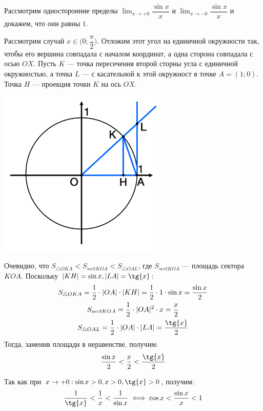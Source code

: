 \documentclass[a4paper,12pt,oneside]{extbook}
\theoremstyle{numbered}
\theoremstyle{unnumbered}
\theoremstyle{named}
\theoremstyle{unnumbered}
\theoremstyle{named}
\theoremstyle{named}
\theoremstyle{named}
\begin{document}
Рассмотрим односторонние пределы \(\displaystyle{\lim_{x \to +0}{\dfrac{\sin{x}}{x}}}\) и \(\displaystyle{\lim_{x \to -0}{\dfrac{\sin{x}}{x}}}\) и докажем, что они равны \(1\).

Рассмотрим случай \(x \in \Big(0; \dfrac{\pi}{2}\Big)\).
Отложим этот угол на единичной окружности так, чтобы его вершина совпадала с началом координат, а одна сторона совпадала с осью \(OX\).
Пусть \(K\) — точка пересечения второй сторны угла с единичной окружностью, а точка \(L\) — с касательной к этой окружност в точке \(A = (1; 0)\). Точка \(H\) — проекция точки \(K\) на ось \(OX\).

\begin{center}
    \includegraphics[width=0.6\textwidth]{limit_1.png}
\end{center}

Очевидно, что \(S_{\triangle OKA} < S_{sect KOA} < S_{\triangle OAL}\), где \(S_{sect KOA}\) — площадь сектора  \(KOA\). Поскольку \(|KH| = \sin{x}, |LA| = \tg{x}\):
\begin{gather*}
    S_{\triangle OKA} = \frac{1}{2} \cdot |OA| \cdot |KH| = \frac{1}{2} \cdot 1 \cdot \sin{x} = \frac{\sin{x}}{2} \\
    S_{sect KOA} = \frac{1}{2} \cdot |OA|^2 \cdot x = \frac{x}{2}                                                 \\
    S_{\triangle OAL} = \frac{1}{2} \cdot |OA| \cdot |LA| = \frac{\tg{x}}{2}
\end{gather*}
Тогда, заменив площади в неравенстве, получим:
\begin{gather*}
    \dfrac{\sin{x}}{2} < \dfrac{x}{2} < \dfrac{\tg{x}}{2}
\end{gather*}

Так как при \(x \to +0: \sin{x} > 0, x > 0, \tg{x} > 0\), получим:
\begin{gather*}
    \dfrac{1}{\tg{x}} < \dfrac{1}{x} < \dfrac{1}{\sin{x}} \iff \cos{x} < \dfrac{\sin{x}}{x} < 1
\end{gather*}
\end{document}
